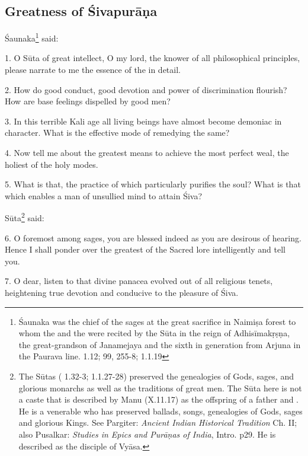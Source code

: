 {}
\subsection*{Greatness of Śivapurāṇa}

Śaunaka\footnote{Śaunaka was the chief of the sages at the great sacrifice in
Naimiṣa forest to whom the  and the  were recited by
the Sūta in the reign of Adhisīmakṛṣṇa, the great-grandson of Janamejaya and
the sixth in generation from Arjuna in the Paurava line.  1.12;
99, 255-8;  1.1.19} said:

1. O Sūta of great intellect, O my lord, the knower of all philosophical
principles, please narrate to me the essence of the  in detail.

2. How do good conduct, good devotion and power of discrimination flourish? How
are base feelings dispelled by good men?

3. In this terrible Kali age all living beings have almost become demoniac in
character. What is the effective mode of remedying the same?

4. Now tell me about the greatest means to achieve the most perfect weal,
the holiest of the holy modes.

5. What is that, the practice of which particularly purifies the soul? What is
that which enables a man of unsullied mind to attain Śiva?

Sūta\footnote{The Sūtas ( 1.32-3;  1.1.27-28)
preserved the genealogies of Gods, sages, and glorious monarchs as well as
the traditions of great men. The Sūta here is not a caste that is described by
Manu (X.11.17) as the offspring of a  father and . He is a venerable  who has preserved ballads, songs,
genealogies of Gods, sages and glorious Kings. See Pargiter: \emph{Ancient
Indian Historical Tradition} Ch. II; also Pusalkar: \emph{Studies in Epics and
Purāṇas of India}, Intro. p29. He is described as the disciple of Vyāsa.} said:

6. O foremost among sages, you are blessed indeed as you are desirous of hearing.
Hence I shall ponder over the greatest of the Sacred lore intelligently and
tell you.

7. O dear, listen to that divine panacea evolved out of all religious tenets,
heightening true devotion and conducive to the pleasure of Śiva.

